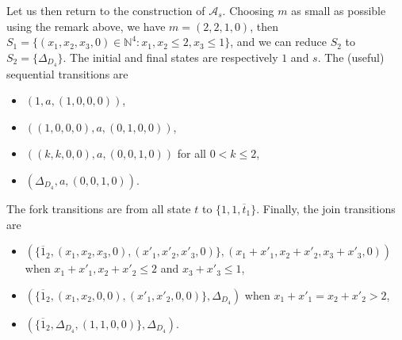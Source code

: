 \documentclass{CSML}
\begin{document}
\begin{exa}
  Let us then return to the construction of $\mathcal{A}_s$. Choosing $m$ as small as possible using the remark above, we have $m=(2,2,1,0)$, then $S_1=\{(x_1,x_2,x_3,0)\in\mathbb{N}^{4} : x_1,x_2\leq 2, x_3\leq 1\}$, and we can reduce $S_2$ to $S_2=\{\Delta_{D_4}\}$. The initial and final states are respectively $1$ and $s$. The (useful) sequential transitions are 
\begin{multicols}{2}
\begin{itemize}
\item $(1,a,(1,0,0,0))$, 
\item $((1,0,0,0),a,(0,1,0,0))$,
\item $((k,k,0,0),a,(0,0,1,0))$ for all $0<k\leq 2$,
\item $(\Delta_{D_4},a,(0,0,1,0))$.
\end{itemize}
\end{multicols}
\noindent The fork transitions are from all state $t$ to $\{1,1,\overline{t}_1\}$. 
Finally, the join transitions are 
\begin{itemize}
\item $(\{\overline{1}_2,(x_1,x_2,x_3,0),(x'_1,x'_2,x'_3,0)\},(x_1+x'_1,x_2+x'_2,x_3+x'_3,0))$ when $x_1+x'_1, x_2+x'_2\leq 2$ and $x_3+x'_3\leq 1$,
\item $(\{\overline{1}_2,(x_1,x_2,0,0),(x'_1,x'_2,0,0)\},\Delta_{D_4})$ when $x_1+x'_1=x_2+x'_2>2$,
\item $(\{\overline{1}_2,\Delta_{D_4},(1,1,0,0)\},\Delta_{D_4})$.
\end{itemize}


\end{exa}
\end{document}
